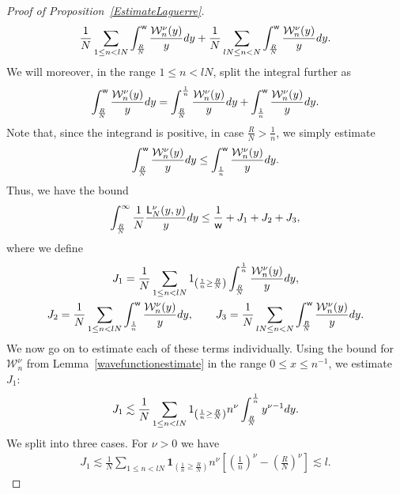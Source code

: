 \documentclass[11pt]{article}
\numberwithin{equation}{section}
\begin{document}
\begin{proof}[Proof of Proposition~\ref{EstimateLaguerre}]
\begin{gather*}
\frac{1}{N}\sum_{1 \le n < lN}^{} \int_{\frac{R}{N}}^{\mathsf{w}}\frac{\mathcal{W}_n^{\nu}(y)}{y}{\rm d}y+\frac{1}{N}\sum_{l N \le n < N}^{} \int_{\frac{R}{N}}^{\mathsf{w}}\frac{\mathcal{W}_n^{\nu}(y)}{y}{\rm d}y.
\end{gather*}
We will moreover, in the range $1 \le n < l N$, split the integral further as
\begin{gather*}
\int_{\frac{R}{N}}^{\mathsf{w}}\frac{\mathcal{W}_n^{\nu}(y)}{y}{\rm d}y =\int_{\frac{R}{N}}^{\frac{1}{n}}\frac{\mathcal{W}_n^{\nu}(y)}{y}{\rm d}y+\int_{\frac{1}{n}}^{\mathsf{w}}\frac{\mathcal{W}_n^{\nu}(y)}{y}{\rm d}y.
\end{gather*}
Note that, since the integrand is positive, in case $\frac{R}{N}>\frac{1}{n}$, we simply estimate
\begin{gather*}
\int_{\frac{R}{N}}^{\mathsf{w}}\frac{\mathcal{W}_n^{\nu}(y)}{y}{\rm d}y \le \int_{\frac{1}{n}}^{\mathsf{w}}\frac{\mathcal{W}_n^{\nu}(y)}{y}{\rm d}y.
\end{gather*}
Thus, we have the bound
\begin{gather*}
\int_{\frac{R}{N}}^{\infty}\frac{1}{N}\frac{\mathsf{L}_N^{\nu}(y,y)}{y}{\rm d}y \le \frac{1}{\mathsf{w}}+J_1+J_2+J_3,
\end{gather*}
where we define
\begin{gather*}
J_1 = \frac{1}{N}\sum_{1 \le n < lN}^{} \textbf{1}_{\left(\frac{1}{n}\ge \frac{R}{N}\right)} \int_{\frac{R}{N}}^{\frac{1}{n}}\frac{\mathcal{W}_n^{\nu}(y)}{y}{\rm d}y,\\
J_2 = \frac{1}{N}\sum_{1 \le n < lN}^{} \int_{\frac{1}{n}}^{\mathsf{w}}\frac{\mathcal{W}_n^{\nu}(y)}{y}{\rm d}y,\qquad
J_3 = \frac{1}{N}\sum_{l N \le n < N}^{} \int_{\frac{R}{N}}^{\mathsf{w}}\frac{\mathcal{W}_n^{\nu}(y)}{y}{\rm d}y.
\end{gather*}
We now go on to estimate each of these terms individually. Using the bound for $\mathcal{W}_n^{\nu}$ from Lemma~\ref{wavefunctionestimate} in the range $0 \le x \le n^{-1}$, we estimate $J_1$:
\begin{gather*}
J_1 \lesssim \frac{1}{N} \sum_{1 \le n < lN}^{}\textbf{1}_{\left(\frac{1}{n}\ge \frac{R}{N}\right)} n^{\nu} \int_{\frac{R}{N}}^{\frac{1}{n}}y^{\nu-1}{\rm d}y.
\end{gather*}
We split into three cases. For $\nu>0$ we have
\begin{gather*}
J_1 \lesssim \frac{1}{N} \sum_{1 \le n < lN}^{}\textbf{1}_{\left(\frac{1}{n}\ge \frac{R}{N}\right)}n^{\nu} \left[\left(\frac{1}{n}\right)^\nu-\left(\frac{R}{N}\right)^\nu\right]\lesssim l.

\end{gather*}
\end{proof}
\end{document}
